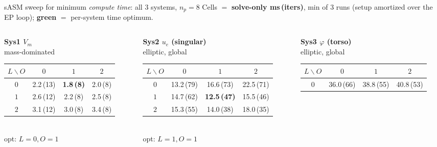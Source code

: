 \documentclass[aspectratio=169,11pt]{beamer}
\begin{document}
\begin{frame}{sASM sweep for minimum \emph{compute time}: all 3 systems, $n_p{=}8$}
Cells $=$ \textbf{solve-only ms\,(iters)}, min of 3 runs (setup amortized over the EP loop); \textbf{\textcolor{good}{green}} $=$ per-system time optimum.
\vspace{0.2em}
\begin{columns}[T]
\begin{column}{0.32\textwidth}\centering
\textbf{Sys1 $V_m$}\\{\tiny mass-dominated}\\[0.2em]
\tiny
\begin{tabular}{@{}c|ccc@{}}
\toprule
$L\backslash O$ & $0$ & $1$ & $2$ \\
\midrule
$0$ & 2.2\,(13) & \textbf{\textcolor{good}{1.8\,(8)}} & 2.0\,(8) \\
$1$ & 2.6\,(12) & 2.2\,(8) & 2.5\,(8) \\
$2$ & 3.1\,(12) & 3.0\,(8) & 3.4\,(8) \\
\bottomrule
\end{tabular}\\[0.15em]
{\tiny opt: $L{=}0,O{=}1$}
\end{column}
\begin{column}{0.34\textwidth}\centering
\textbf{Sys2 $u_e$ (singular)}\\{\tiny elliptic, global}\\[0.2em]
\tiny
\begin{tabular}{@{}c|ccc@{}}
\toprule
$L\backslash O$ & $0$ & $1$ & $2$ \\
\midrule
$0$ & 13.2\,(79) & 16.6\,(73) & 22.5\,(71) \\
$1$ & 14.7\,(62) & \textbf{\textcolor{good}{12.5\,(47)}} & 15.5\,(46) \\
$2$ & 15.3\,(55) & 14.0\,(38) & 18.0\,(35) \\
\bottomrule
\end{tabular}\\[0.15em]
{\tiny opt: $L{=}1,O{=}1$}
\end{column}
\begin{column}{0.32\textwidth}\centering
\textbf{Sys3 $\varphi$ (torso)}\\{\tiny elliptic, global}\\[0.2em]
\tiny
\begin{tabular}{@{}c|ccc@{}}
\toprule
$L\backslash O$ & $0$ & $1$ & $2$ \\
\midrule
$0$ & 36.0\,(66) & 38.8\,(55) & 40.8\,(53) \\

\end{tabular}
\end{column}
\end{columns}
\end{frame}
\end{document}
